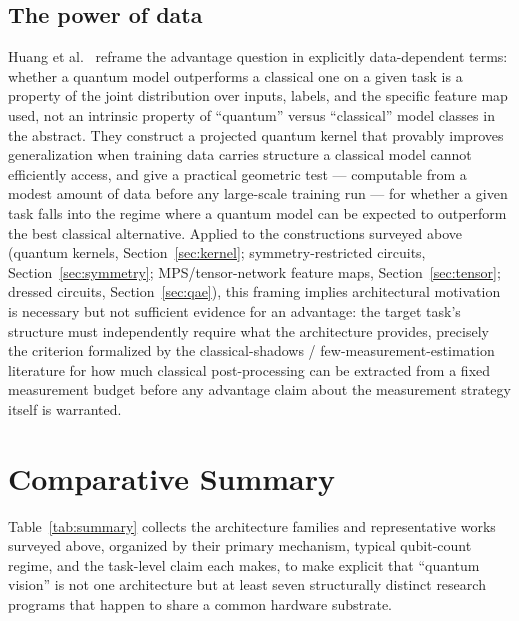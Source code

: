 \documentclass[11pt]{article}
\begin{document}
\subsection{The power of data}
Huang et al.\ \cite{Huang2021PowerData} reframe the advantage question in explicitly data-dependent terms: whether a quantum model outperforms a classical one on a given task is a property of the joint distribution over inputs, labels, and the specific feature map used, not an intrinsic property of ``quantum'' versus ``classical'' model classes in the abstract. They construct a projected quantum kernel that provably improves generalization when training data carries structure a classical model cannot efficiently access, and give a practical geometric test — computable from a modest amount of data before any large-scale training run — for whether a given task falls into the regime where a quantum model can be expected to outperform the best classical alternative. Applied to the constructions surveyed above (quantum kernels, Section~\ref{sec:kernel}; symmetry-restricted circuits, Section~\ref{sec:symmetry}; MPS/tensor-network feature maps, Section~\ref{sec:tensor}; dressed circuits, Section~\ref{sec:qae}), this framing implies architectural motivation is necessary but not sufficient evidence for an advantage: the target task's structure must independently require what the architecture provides, precisely the criterion formalized by the classical-shadows / few-measurement-estimation literature \cite{Huang2020Shadows} for how much classical post-processing can be extracted from a fixed measurement budget before any advantage claim about the measurement strategy itself is warranted.

\section{Comparative Summary}
\label{sec:summary}
Table~\ref{tab:summary} collects the architecture families and representative works surveyed above, organized by their primary mechanism, typical qubit-count regime, and the task-level claim each makes, to make explicit that ``quantum vision'' is not one architecture but at least seven structurally distinct research programs that happen to share a common hardware substrate.
\end{document}
